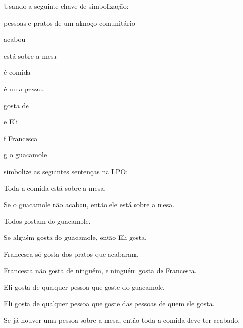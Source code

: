 \problempart
Usando a seguinte chave de simbolização:
\begin{ekey}
\item[\text{domínio}] pessoas e pratos de um almoço comunitário
\item[\atom{R}{x}]  acabou
\item[\atom{T}{x}]  está sobre a mesa
\item[\atom{F}{x}]  é comida
\item[\atom{P}{x}]  é uma pessoa
\item[\atom{L}{x,y}]  gosta de 
\item[e] Eli
\item[f] Francesca
\item[g] o guacamole
\end{ekey}
simbolize as seguintes sentenças na LPO:
\begin{compactlist}
\item Toda a comida está sobre a mesa.
\item[] 
\item Se o guacamole não acabou, então ele está sobre a mesa.
\item[] 
\item Todos gostam do guacamole.
\item[] 
\item Se alguém gosta do guacamole, então Eli gosta.
\item[] 
\item Francesca só gosta dos pratos que acabaram.
\item[] 
\item Francesca não gosta de ninguém, e ninguém gosta de Francesca.
\item[] 
\item Eli gosta de qualquer pessoa que goste do guacamole.
\item[] 
\item Eli gosta de qualquer pessoa que goste das pessoas de quem ele gosta.
\item[] 
\item Se já houver uma pessoa sobre a mesa, então toda a comida deve ter acabado.
\item[] 
\end{compactlist}

